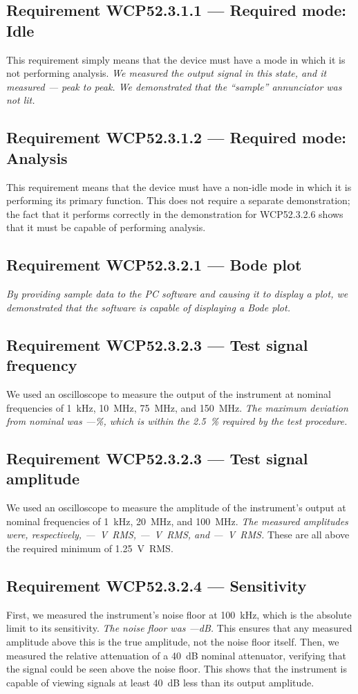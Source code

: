 \subsection*{Requirement WCP52.3.1.1 --- Required mode: Idle}
This requirement simply means that the device must have a mode in which it is
not performing analysis. \emph{We measured the output signal in this state, and
it measured --- \uV peak to peak. We demonstrated that the ``sample'' annunciator
was not lit.}

\subsection*{Requirement WCP52.3.1.2 --- Required mode: Analysis}
This requirement means that the device must have a non-idle mode in which it is
performing its primary function. This does not require a separate demonstration;
the fact that it performs correctly in the demonstration for WCP52.3.2.6 shows
that it must be capable of performing analysis.

\subsection*{Requirement WCP52.3.2.1 --- Bode plot}
\emph{By providing sample data to the PC software and causing it to display a
plot, we demonstrated that the software is capable of displaying a Bode plot.}

\subsection*{Requirement WCP52.3.2.3 --- Test signal frequency}
We used an oscilloscope to measure the output of the instrument at nominal
frequencies of 1~kHz, 10~MHz, 75~MHz, and 150~MHz. \emph{The maximum deviation from
nominal was ---\%, which is within the 2.5~\% required by the test procedure.}

\subsection*{Requirement WCP52.3.2.3 --- Test signal amplitude}
We used an oscilloscope to measure the amplitude of the instrument's output
at nominal frequencies of 1~kHz, 20~MHz, and 100~MHz. \emph{The measured amplitudes
were, respectively, ---~V~RMS, ---~V~RMS, and ---~V~RMS.} These are all above the
required minimum of 1.25~V~RMS.

\subsection*{Requirement WCP52.3.2.4 --- Sensitivity}
First, we measured the instrument's noise floor at 100~kHz, which is the
absolute limit to its sensitivity. \emph{The noise floor was ---dB.} This
ensures that any measured amplitude above this is the true amplitude, not
the noise floor itself. Then, we measured the relative attenuation of a
40~dB nominal attenuator, verifying that the signal could be seen above the
noise floor. This shows that the instrument is capable of viewing signals
at least 40~dB less than its output amplitude.

